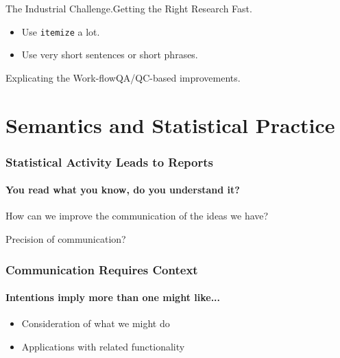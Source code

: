 \documentclass{beamer}
\begin{document}
\begin{frame}{The Industrial Challenge.}{Getting the Right Research Fast.}

  \begin{itemize}
  \item
    Use \texttt{itemize} a lot.
  \item
    Use very short sentences or short phrases.
  \end{itemize}
\end{frame}


\begin{frame}{Explicating the Work-flow}{QA/QC-based improvements.}


\end{frame}

\section{Semantics and Statistical Practice}


\begin{frame}
  \frametitle{Statistical Activity Leads to Reports}
  \framesubtitle{You read what you know, do you understand it?}

  How can we improve the communication of the ideas we have?

  Precision of communication?

\end{frame}



\begin{frame}  \frametitle{Communication Requires Context}
  \framesubtitle{Intentions imply more than one might like...}

  \begin{itemize}
  \item Consideration of what we might do
  \item Applications with related functionality
  \end{itemize}
\end{frame}
\end{document}

